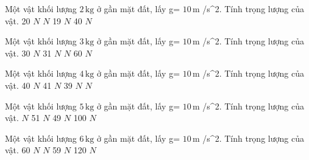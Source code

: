 \begin{ex}
Một vật khối lượng $2\,\text{kg}$ ở gần mặt đất, lấy g= $10\,\text{m}$ /s^2. Tính trọng lượng của vật.
\choice
{20 $N$}
{ $N$}
{19 $N$}
{40 $N$}
\end{ex}

\begin{ex}
Một vật khối lượng $3\,\text{kg}$ ở gần mặt đất, lấy g= $10\,\text{m}$ /s^2. Tính trọng lượng của vật.
\choice
{30 $N$}
{31 $N$}
{ $N$}
{60 $N$}
\end{ex}

\begin{ex}
Một vật khối lượng $4\,\text{kg}$ ở gần mặt đất, lấy g= $10\,\text{m}$ /s^2. Tính trọng lượng của vật.
\choice
{40 $N$}
{41 $N$}
{39 $N$}
{ $N$}
\end{ex}

\begin{ex}
Một vật khối lượng $5\,\text{kg}$ ở gần mặt đất, lấy g= $10\,\text{m}$ /s^2. Tính trọng lượng của vật.
\choice
{ $N$}
{51 $N$}
{49 $N$}
{100 $N$}
\end{ex}

\begin{ex}
Một vật khối lượng $6\,\text{kg}$ ở gần mặt đất, lấy g= $10\,\text{m}$ /s^2. Tính trọng lượng của vật.
\choice
{60 $N$}
{ $N$}
{59 $N$}
{120 $N$}
\end{ex}

